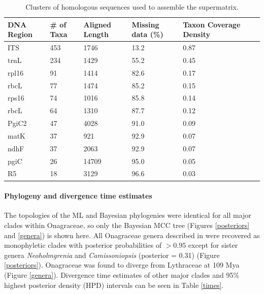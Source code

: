 \documentclass[review]{elsarticle}
\begin{document}
\begin{table}
   \center
   \begin{adjustbox}{max width=\textwidth}
      \begin{tabular}{lllllll}
         \toprule
         DNA Region & \# of Taxa & Aligned Length & Missing data (\%) & Taxon Coverage Density \\ 
	 \midrule
         ITS & 453 & 1746 & 13.2 & 0.87 \\
         trnL & 234 & 1429 & 55.2 & 0.45 \\
         rpl16 & 91 & 1414 & 82.6 & 0.17 \\
         rbcL & 77 & 1474 & 85.2 & 0.15 \\
         rps16 & 74 & 1016 & 85.8 & 0.14 \\
         rbcL & 64 & 1310 & 87.7 & 0.12 \\
         PgiC2 & 47 & 4028 & 91.0 & 0.09 \\
         matK & 37 & 921 & 92.9 & 0.07 \\
         ndhF & 37 & 2063 & 92.9 & 0.07 \\
         pgiC & 26 & 14709 & 95.0 & 0.05 \\
         R5 & 18 & 3129 & 96.6 & 0.03 \\
         \bottomrule
      \end{tabular}
   \end{adjustbox}
   \caption{Clusters of homologous sequences used to assemble the supermatrix.}
   \label{clusters}
\end{table}

\paragraph{Phylogeny and divergence time estimates}
The topologies of the ML and Bayesian phylogenies were identical for all major clades within Onagraceae, 
so only the Bayesian MCC tree (Figures \ref{posteriors} and \ref{genera}) is shown here.
All Onagraceae genera described in \citet{wagner2007revised} were recovered as monophyletic clades with posterior probabilities of $> 0.95$
except for sister genera \textit{Neoholmgrenia} and \textit{Camissoniopsis} (posterior = 0.31) (Figure \ref{posteriors}).
Onagraceae was found to diverge from Lythraceae at 109 Mya (Figure \ref{genera}). 
Divergence time estimates of other major clades and 95\% highest posterior density (HPD) intervals can be seen in Table \ref{times}.
\end{document}
